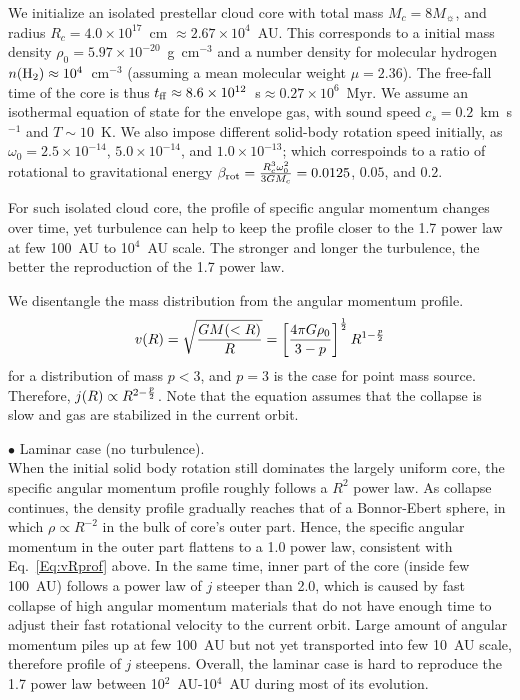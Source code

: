 We initialize an isolated prestellar cloud core with total mass
$M_c=8 M_{\sun}$, and radius $R_c=4.0 \times 10^{17}$~cm
$\approx 2.67 \times 10^4$~AU. This corresponds to a initial mass density
$\rho_0=5.97 \times 10^{-20}$~g~cm$^{-3}$ and a number density for molecular
hydrogen $n({\rm H}_2) \approx 10^4$~cm$^{-3}$ (assuming a mean molecular
weight $\mu=2.36$). The free-fall time of the core is thus
$t_{\rm ff} \approx 8.6 \times 10^{12}$~s$\approx 0.27 \times 10^6$~Myr.
We assume an isothermal equation of state for the envelope gas, with
sound speed $c_s=0.2$~km~s$^{-1}$ and $T \sim 10$~K. We also impose different
solid-body rotation speed initially, as $\omega_0=2.5 \times 10^{-14}$,
$5.0 \times 10^{-14}$, and $1.0 \times 10^{-13}$; which correspoinds to
a ratio of rotational to gravitational energy
$\beta_{\rm rot}={R_c^3 \omega_0^2 \over 3 G M_c} = 0.0125$, $0.05$, and
$0.2$.

For such isolated cloud core, the profile of specific angular momentum
changes over time, yet turbulence can help to keep the profile
closer to the 1.7 power law at few 100~AU to 10$^4$~AU scale.
The stronger and longer the turbulence,
the better the reproduction of the 1.7 power law.

We disentangle the mass distribution from the angular momentum
profile.
\begin{equation}
\label{Eq:vRprof}
v(R)=\sqrt{G M(<R) \over R}=\left[{ 4 \pi G \rho_0 \over 3-p}\right]^{1 \over 2
} R^{1-{p \over 2}}
\end{equation}
for a distribution of mass $p<3$, and $p=3$ is the case for point mass source.
Therefore, $j(R) \propto R^{2-{p \over 2}}$. Note that the equation
assumes that the collapse is slow and gas are stabilized in the
current orbit.

\noindent $\bullet$ Laminar case (no turbulence).\\
When the initial solid body rotation still dominates the largely uniform core,
the specific angular momentum profile roughly follows a $R^2$ power law.
As collapse continues, the density profile gradually reaches
that of a Bonnor-Ebert sphere, in which $\rho \propto R^{-2}$
in the bulk of core's outer part.
Hence, the specific angular momentum in the outer part flattens to
a 1.0 power law, consistent with Eq.~\ref{Eq:vRprof} above. In the same
time, inner part of the core (inside few 100~AU) follows a power law of
$j$ steeper than 2.0, which is caused by fast collapse of high angular momentum
materials that do not have enough time to adjust their fast
rotational velocity to the current orbit. Large amount of angular
momentum piles up at few 100~AU but not yet transported into few 10~AU scale,
therefore profile of $j$ steepens. Overall, the laminar case is hard
to reproduce the 1.7 power law between
10$^2$~AU-10$^4$~AU during most of its evolution.

